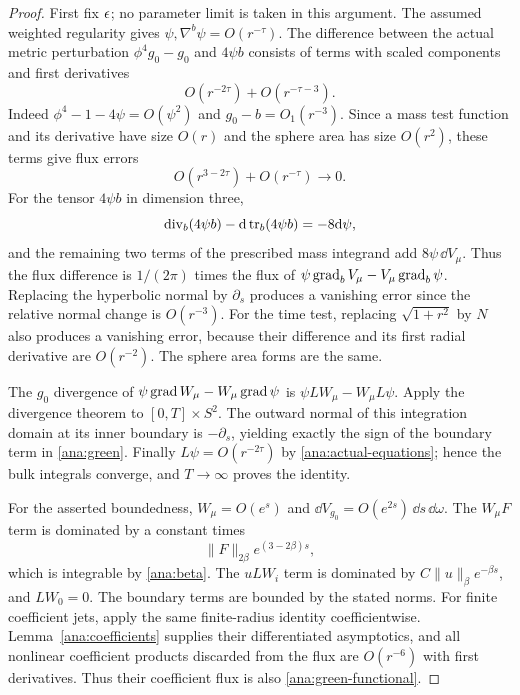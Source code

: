 \begin{proof}
First fix $\epsilon$; no parameter limit is taken in this argument.
The assumed weighted regularity gives
$\psi,\nabla^b\psi=O(r^{-\tau})$.  The difference between the actual
metric perturbation $\phi^4g_0-g_0$ and $4\psi b$ consists of terms
with scaled components and first derivatives
\[
 O(r^{-2\tau})+O(r^{-\tau-3}).
\]
Indeed $\phi^4-1-4\psi=O(\psi^2)$ and
$g_0-b=O_1(r^{-3})$.  Since a mass test function and its derivative
have size $O(r)$ and the sphere area has size $O(r^2)$, these terms
give flux errors
\begin{equation}
 O(r^{3-2\tau})+O(r^{-\tau})\longrightarrow0.
 \label{ana:flux-errors}
\end{equation}
For the tensor $4\psi b$ in dimension three,
\[
 \operatorname{div}_b(4\psi b)-\mathrm{d}\operatorname{tr}_b(4\psi b)=-8\mathrm{d}\psi,
\]
and the remaining two terms of the prescribed mass integrand add
$8\psi\,\dd V_\mu$.  Thus the flux difference is $1/(2\pi)$ times
the flux of $\psi\operatorname{grad}_bV_\mu-V_\mu\operatorname{grad}_b\psi$.
Replacing the hyperbolic normal by $\partial_s$ produces a vanishing
error since the relative normal change is $O(r^{-3})$.
For the time test, replacing $\sqrt{1+r^2}$ by $N$ also produces a
vanishing error, because their difference and its first radial
derivative are $O(r^{-2})$.  The sphere area forms are the same.

The $g_0$ divergence of
$\psi\operatorname{grad} W_\mu-W_\mu\operatorname{grad}\psi$ is
$\psi LW_\mu-W_\mu L\psi$.  Apply the divergence theorem to
$[0,T]\times S^2$.  The outward normal of this integration domain
at its inner boundary is $-\partial_s$, yielding exactly the sign of
the boundary term in \eqref{ana:green}.  Finally
$L\psi=O(r^{-2\tau})$ by \eqref{ana:actual-equations}; hence the
bulk integrals converge, and $T\to\infty$ proves the identity.

For the asserted boundedness, $W_\mu=O(e^s)$ and
$\dd V_{g_0}=O(e^{2s})\,\dd s\,\dd\omega$.
The $W_\mu F$ term is dominated by a constant times
\[
 \|F\|_{2\beta}e^{(3-2\beta)s},
\]
which is integrable by \eqref{ana:beta}.  The $uLW_i$ term is
dominated by $C\|u\|_\beta e^{-\beta s}$, and $LW_0=0$.
The boundary terms are bounded by the stated norms.
For finite coefficient jets, apply the same finite-radius identity
coefficientwise.  Lemma~\ref{ana:coefficients} supplies their
differentiated asymptotics, and all nonlinear coefficient products
discarded from the flux are $O(r^{-6})$ with first derivatives.
Thus their coefficient flux is also
\eqref{ana:green-functional}.
\end{proof}

